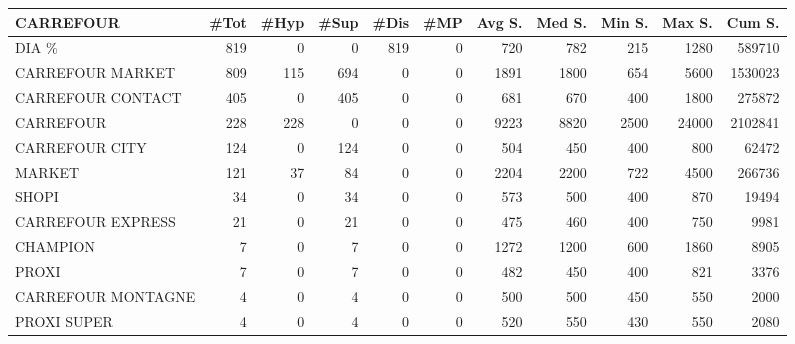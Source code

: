 \documentclass[11pt]{article}
\begin{document}
\begin{table}[H]
\footnotesize
\setlength{\tabcolsep}{2pt}
\begin{tabular}{lrrrrrrrrrr}
\toprule
CARREFOUR &       \#Tot &       \#Hyp &       \#Sup &       \#Dis &        \#MP &     Avg S. &     Med S. &     Min S. &     Max S. &     Cum S. \\
\midrule
DIA \%              &        819 &          0 &          0 &        819 &          0 &        720 &        782 &        215 &       1280 &     589710 \\
CARREFOUR MARKET   &        809 &        115 &        694 &          0 &          0 &       1891 &       1800 &        654 &       5600 &    1530023 \\
CARREFOUR CONTACT  &        405 &          0 &        405 &          0 &          0 &        681 &        670 &        400 &       1800 &     275872 \\
CARREFOUR          &        228 &        228 &          0 &          0 &          0 &       9223 &       8820 &       2500 &      24000 &    2102841 \\
CARREFOUR CITY     &        124 &          0 &        124 &          0 &          0 &        504 &        450 &        400 &        800 &      62472 \\
MARKET             &        121 &         37 &         84 &          0 &          0 &       2204 &       2200 &        722 &       4500 &     266736 \\
SHOPI              &         34 &          0 &         34 &          0 &          0 &        573 &        500 &        400 &        870 &      19494 \\
CARREFOUR EXPRESS  &         21 &          0 &         21 &          0 &          0 &        475 &        460 &        400 &        750 &       9981 \\
CHAMPION           &          7 &          0 &          7 &          0 &          0 &       1272 &       1200 &        600 &       1860 &       8905 \\
PROXI              &          7 &          0 &          7 &          0 &          0 &        482 &        450 &        400 &        821 &       3376 \\
CARREFOUR MONTAGNE &          4 &          0 &          4 &          0 &          0 &        500 &        500 &        450 &        550 &       2000 \\
PROXI SUPER        &          4 &          0 &          4 &          0 &          0 &        520 &        550 &        430 &        550 &       2080 \\

\end{tabular}
\end{table}
\end{document}
